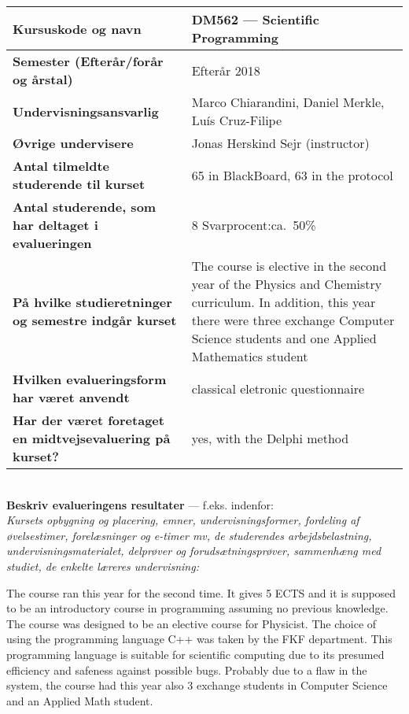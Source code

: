 \documentclass[11pt]{article}
\begin{document}
\tabulinesep=1.2mm
\begin{tabu} to 1.0 \hline
Kursuskode og navn &  DM562 --- Scientific Programming \\\hline
Semester {\normalfont (Efterår/forår og årstal)} & Efterår 2018 \\\hline
Undervisnings\-ansvarlig &  Marco Chiarandini, Daniel Merkle, Luís Cruz-Filipe  \\\hline
Øvrige undervisere &   Jonas Herskind Sejr (instructor) \\\hline
Antal tilmeldte studerende til kurset & 65 in BlackBoard, 63 in the protocol \\\hline
Antal studerende, som har deltaget i evalueringen &  8  \hfill
Svarprocent:ca.~50\% \\\hline
På hvilke studieretninger og semestre indgår kurset &  The course is elective in the second year of the Physics and Chemistry curriculum. In addition, this year there were three exchange Computer Science students and one Applied Mathematics student \\\hline
Hvilken evalueringsform har været anvendt &  classical eletronic questionnaire \\\hline
Har der været foretaget en midtvejsevaluering på kurset? &  yes, with the Delphi method  \\ 
\hline
\end{tabu}

~\\[1cm]\textcolor{sdublue}{{\bf Beskriv evalueringens resultater} ---
  f.eks. indenfor:\\ {\small \em Kursets opbygning og placering,
    emner, undervisningsformer, fordeling af øvelsestimer,
    forelæsninger og e-timer mv, de studerendes arbejdsbelastning,
    undervisningsmaterialet, delprøver og forudsætningsprøver,
    sammenhæng med studiet, de enkelte læreres undervisning:}}



The course ran this year for the second time. It gives 5 ECTS and it is
supposed to be an introductory course in programming assuming no
previous knowledge. The course was designed to be an elective course for
Physicist. The choice of using the programming language C++ was taken by
the FKF department. This programming language is suitable for scientific
computing due to its presumed efficiency and safeness against possible
bugs. Probably due to a flaw in the system, the course had this year
also 3 exchange students in Computer Science and an Applied Math
student.
\end{document}
